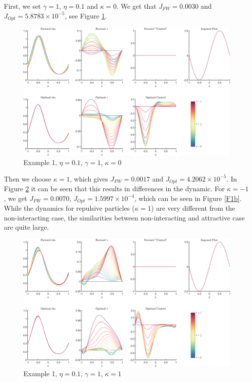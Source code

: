 \documentclass[11pt, a4paper]{article}
\theoremstyle{definition}
\begin{document}
	First, we set $\gamma = 1$, $\eta = 0.1$ and $\kappa = 0$. We get that $J_{FW} = 0.0030$ and $J_{Opt} = 5.8783 \times 10^{-5}$, see Figure \ref{F1}.
	\begin{figure}[h]
		\centering
		\includegraphics[scale=0.04]{Example1.png}
		\caption{Example 1, $\eta = 0.1$, $\gamma = 1$, $\kappa = 0$} 
		\label{F1}
	\end{figure}
    Then we choose $\kappa = 1$, which gives $J_{FW} = 0.0017$ and $J_{Opt} = 4.2062 \times 10^{-5}$. In Figure \ref{F1a} it can be seen that this results in differences in the dynamic. 
    For $\kappa = -1$, we get $J_{FW} = 0.0070$, $J_{Opt} = 1.5997 \times 10^{-4}$, which can be seen in Figure \ref{F1b}. While the dynamics for repulsive particles ($\kappa = 1$) are very different from the non-interacting case, the similarities between non-interacting and attractive case are quite large.
\begin{figure}[h]
	\centering
	\includegraphics[scale=0.04]{Example111.png}
	\caption{Example 1, $\eta = 0.1$, $\gamma = 1$, $\kappa = 1$} 
	\label{F1a}
\end{figure}
\end{document}
